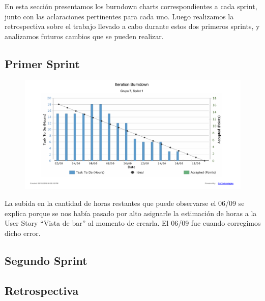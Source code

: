 En esta sección presentamos los burndown charts correspondientes a cada sprint, junto con las aclaraciones pertinentes para cada uno. Luego realizamos la retrospectiva sobre el trabajo llevado a cabo durante estos dos primeros sprints, y analizamos futuros cambios que se pueden realizar. 

\subsection{Primer Sprint}

\begin{figure}[H]
 \centering
  \includegraphics[width=\textwidth]{diagramas/iteration_burndown1.pdf}
  \caption{}
  \label{fig:burndown1}
\end{figure}

La subida en la cantidad de horas restantes que puede observarse el 06/09 se explica porque se nos había pasado por alto asignarle la estimación de horas a la User Story ``Vista de bar'' al momento de crearla. El 06/09 fue cuando corregimos dicho error.

\subsection{Segundo Sprint}

\subsection{Retrospectiva}
